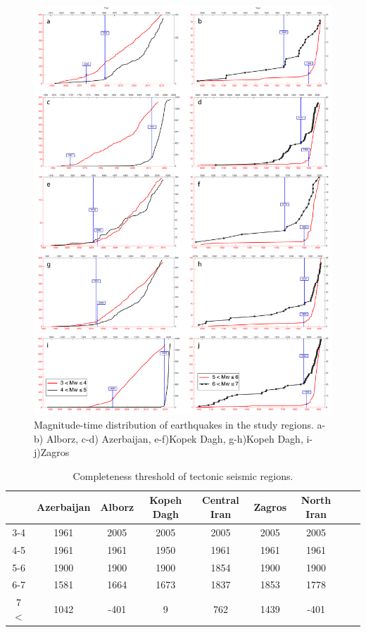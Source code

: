\begin{figure} [!ht]
\centering
\includegraphics[scale=0.28]{figures/pdf/comp_test_all_mag.pdf} 
\caption{Magnitude-time distribution of earthquakes in the study regions. a-b) Alborz, c-d) Azerbaijan, e-f)Kopek Dagh, g-h)Kopeh Dagh, i-j)Zagros}
\label{fig:comp_test_all_mag}
\end{figure}



\begin{table}[!ht]
\centering
\caption{Completeness threshold of tectonic seismic regions.}
\begin{tabular}{ccccccccc}
 ~           & Azerbaijan & Alborz & Kopeh Dagh & Central Iran & Zagros & North Iran  \\ \hline
3-4         & 1961          & 2005   & 2005             & 2005            & 2005    & 2005          \\ \hline
4-5         & 1961          & 1961   & 1950             & 1961            & 1961    & 1961          \\ \hline
5-6         & 1900          & 1900   & 1900             & 1854            & 1900    & 1900           \\ \hline
6-7         & 1581          & 1664   & 1673             & 1837            & 1853    & 1778           \\ \hline
7 $< $    & 1042          & -401    & 9                   & 762              & 1439    & -401            \\ 
\end{tabular}
\label{tab:completeness}
\end{table}
